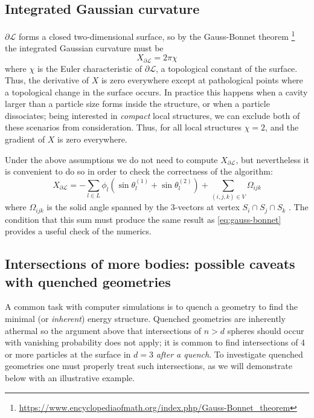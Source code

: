 \subsection{Integrated Gaussian curvature}

$\partial\mathcal{L}$ forms a closed two-dimensional surface, so by the Gauss-Bonnet theorem \footnote{\url{https://www.encyclopediaofmath.org/index.php/Gauss-Bonnet_theorem}} the integrated Gaussian curvature must be
\begin{equation}\label{eq:gauss-bonnet}
  X_{\partial\mathcal{L}} = 2\pi \chi
\end{equation}
where $\chi$ is the Euler characteristic of $\partial\mathcal{L}$, a topological constant of the surface.
Thus, the derivative of $X$ is zero everywhere except at pathological points where a topological change in the surface occurs.
In practice this happens when a cavity larger than a particle size forms inside the structure, or when a particle dissociates; being interested in \emph{compact} local structures, we can exclude both of these scenarios from consideration.
Thus, for all local structures $\chi=2$, and the gradient of $X$ is zero everywhere.

Under the above assumptions we do not need to compute $X_{\partial\mathcal{L}}$, but nevertheless it is convenient to do so in order to check the correctness of the algorithm:
\begin{equation}
  X_{\partial\mathcal{L}} =
  -\sum_{l \in L} \phi_l (\sin{\theta_l^{(1)}} + \sin{\theta_l^{(2)}}) +
  \sum_{(i,j,k) \in V} \Omega_{ijk}
\end{equation}
where $\Omega_{ijk}$ is the solid angle spanned by the 3-vectors at vertex $S_i \cap S_j \cap S_k$ \cite{Mecke1994}.
The condition that this sum must produce the same result as \eqref{eq:gauss-bonnet} provides a useful check of the numerics.

\subsection{Intersections of more bodies: possible caveats with quenched geometries}
\label{sec:higher-order-intersections}

A common task with computer simulations is to quench a geometry to find the minimal (or \emph{inherent}) energy structure.
Quenched geometries are inherently athermal so the argument above that intersections of $n>d$ spheres should occur with vanishing probability does not apply; it is common to find intersections of 4 or more particles at the surface in $d=3$ \emph{after a quench}.
To investigate quenched geometries one must properly treat such intersections, as we will demonstrate below with an illustrative example.

